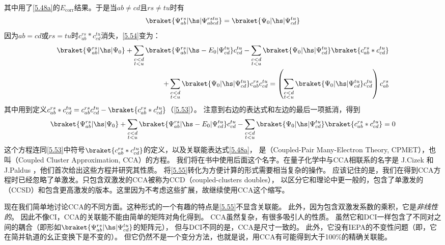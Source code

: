 其中用了\autoref{5.48a}的$E_{\text{corr}}$结果。于是当$ab\neq cd$且$rs\neq tu$时有
\begin{align*}
    \braket{\Psi_{ab}^{rs}|\hs|\Psi_{abcd}^{rstu}}=\braket{\Psi_0|\hs|\Psi_{cd}^{tu}}
\end{align*}
因为$ab=cd$或$rs=tu$时$c_{ab}^{rs}*c_{cd}^{tu}$消失，\autoref{5.54}变为：
\begin{align*}
    \braket{\Psi_{ab}^{rs}|\hs|\Psi_0}+\sum_{\substack{c<d\\t<u}}\braket{\Psi_{ab}^{rs}|\hs-E_0|\Psi_{cd}^{tu}}c_{cd}^{tu}
    -\sum_{\substack{c<d\\t<u}}\braket{\Psi_0|\hs|\Psi_{cd}^{tu}}\braket{c_{ab}^{rs}*c_{cd}^{tu}} \\
    +\sum_{\substack{c<d\\t<u}}\braket{\Psi_0|\hs|\Psi_{cd}^{tu}}c_{ab}^{rs}c_{cd}^{tu}
    =\left(\sum_{\substack{c<d\\t<u}}\braket{\Psi_0|\hs|\Psi_{cd}^{tu}}c_{cd}^{tu}\right)c_{ab}^{rs}
\end{align*}
其中用到定义$c_{ab}^{rs}*c_{cd}^{tu}=c_{ab}^{rs}c_{cd}^{tu}-\braket{c_{ab}^{rs}*c_{cd}^{tu}}$（\autoref{5.53}）。
注意到右边的表达式和左边的最后一项抵消，得到
\begin{align}
    \label{5.55}
    \braket{\Psi_{ab}^{rs}|\hs|\Psi_0}+\sum_{\substack{c<d\\t<u}}\braket{\Psi_{ab}^{rs}|\hs-E_0|\Psi_{cd}^{tu}}c_{cd}^{tu}
    -\sum_{\substack{c<d\\t<u}}\braket{\Psi_0|\hs|\Psi_{cd}^{tu}}\braket{c_{ab}^{rs}*c_{cd}^{tu}} =0
\end{align}
这个方程连同\autoref{5.53}中符号$\braket{c_{ab}^{rs}*c_{cd}^{tu}}$的定义，以及关联能表达式\autoref{5.48a}，
是（Coupled-Pair Many-Electron Theory, CPMET），也叫（Coupled Cluster Approximation, CCA）的方程。
我们将在书中使用后面这个名字。在量子化学中与CCA相联系的名字是 J.Cizek 和 J.Paldus
 ，他们首次给出这些方程并研究其性质。
将\autoref{5.55}转化为方便计算的形式需要相当复杂的操作。
应该记住的是，我们在得到CCA方程时已经忽略了单激发。只包含双激发的CCA被称为CCD（coupled-clusters doubles），
以区分它和理论中更一般的，包含了单激发的（CCSD）和包含更高激发的版本。这里因为不考虑这些扩展，故继续使用CCA这个缩写。

现在我们简单地讨论CCA的不同方面。这种形式的一个有趣的特点是\autoref{5.55}不显含关联能。
此外，因为包含双激发系数的乘积，它是\emph{非线性的}。
因此不像CI，CCA的关联能不能由简单的矩阵对角化得到。
CCA虽然复杂，有很多吸引人的性质。
虽然它和DCI一样包含了不同对之间的耦合（即形如$\braket{\Psi_{ab}^{rs}|\hs|\Psi_{cd}^{tu}}$的矩阵元），
但与DCI不同的是，CCA是尺寸一致的。
此外，它没有IEPA的不变性问题（即，它在简并轨道的幺正变换下是不变的）。
但它仍然不是一个变分方法，也就是说，用CCA有可能得到大于100\%的精确关联能。

